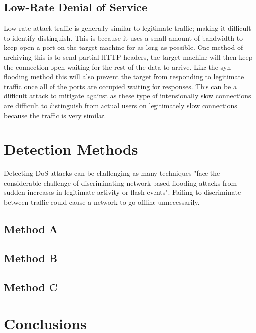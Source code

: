 \documentclass[conference, a4paper]{IEEEtran}
\begin{document}
\subsection{Low-Rate Denial of Service}
Low-rate attack traffic is generally similar to legitimate traffic; making it difficult to identify distinguish.\cite{two_layer_approach__DDOS}
This is because it uses a small amount of bandwidth to keep open a port on the target machine for as long as possible.
One method of archiving this is to send partial HTTP headers, the target machine will then keep the connection open waiting for the rest of the data to arrive.
Like the syn-flooding method this will also prevent the target from responding to legitimate traffic once all of the ports are occupied waiting for responses.
This can be a difficult attack to mitigate against as these type of intensionally slow connections are difficult to distinguish from actual users on legitimately slow connections because the traffic is very similar.\cite{cloudflare_low_rate}

\section{Detection Methods}
    Detecting DoS attacks can be challenging as many techniques "face the considerable challenge of discriminating network-based flooding attacks from sudden increases in legitimate activity or flash events".\cite{detection_methods_2006}
    Failing to discriminate between traffic could cause a network to go offline unnecessarily.

\subsection{Method A}
\subsection{Method B}
\subsection{Method C}

\section{Conclusions}
\end{document}

